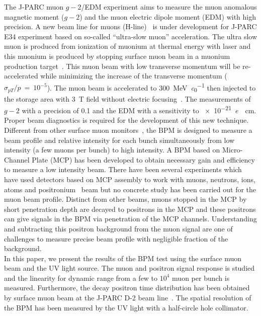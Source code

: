 \documentclass[preprint,3p,twocolumn]{elsarticle}
\begin{document}
The J-PARC muon $g-2$/EDM experiment \cite{E34} aims to measure the muon anomalous magnetic moment ($g-2$) and the muon electric dipole moment (EDM) with high precision.
A new beam line for muons (H-line)~\cite{h-line} is under development for J-PARC E34 experiment based on so-called ``ultra-slow muon'' acceleration.
The ultra slow muon is produced from ionization of muonium at thermal energy with laser and this muonium is produced by stopping surface muon beam in a muonium production target~\cite{muonium}.  
This muon beam with low transverse momentum will be re-accelerated while minimizing the increase of the transverse momentum ($\sigma_{pT}/p~=~10^{-5}$).
The muon beam is accelerated to \SI{300}{\MeV\per\clight} \cite{IH} then injected to the storage area with \SI{3}{\tesla} field without electric focusing~\cite{injection}. The measurements of $g-2$ with a precision of \SI{0.1}{\ppm} and the EDM with a sensitivity to \SI{e-21}{\elementarycharge \cdot \cm}.  Proper beam diagnostics is required for the development of this new technique. \\
Different from other surface muon monitors~\cite{muon_bpm1}, the BPM is designed to measure a beam profile and relative intensity for each bunch simultaneously from low intensity (a few muons per bunch) to high intensity.
A BPM based on Micro-Channel Plate (MCP) has been developed to obtain necessary gain and efficiency to measure a low intensity beam.
There have been several experiments which have used detectors based on MCP assembly to work with muons, neutrons, ions, atoms and positronium~\cite{muon_bpm2, neutron, Ps} beam
but no concrete study has been carried out for the muon beam profile.
Distinct from other beams, muons stopped in the MCP by short penetration depth are decayed to positrons in the MCP and these positrons can give signals in the BPM via penetration of the MCP channels. 
Understanding and subtracting this positron background from the muon signal are one of challenges to measure precise beam profile with negligible fraction of the background.  \\
In this paper, we present the results of the BPM test using the surface muon beam and the UV light source.
The muon and positron signal response is studied and the linearity for dynamic range from a few to $10^{4}$ muon per bunch is measured.
Furthermore, the decay positron time distribution has been obtained by surface muon beam at the J-PARC D-2 beam line~\cite{D-line, D-line1}.  
The spatial resolution of the BPM has been measured by the UV light with a half-circle hole collimator.
\end{document}
